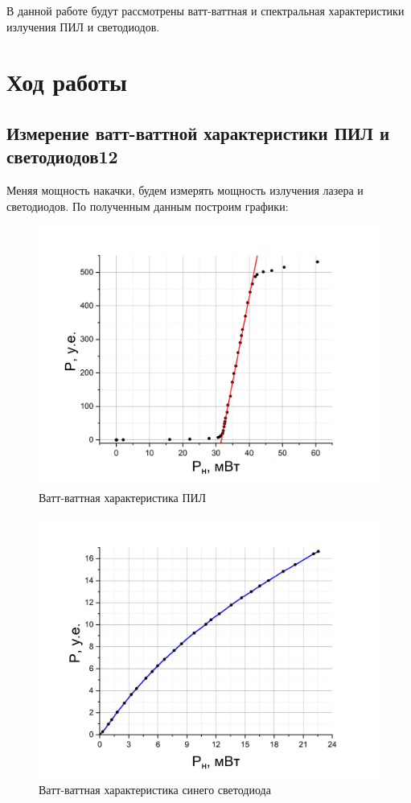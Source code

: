 \documentclass[a4paper,12pt]{article}
\begin{document}
В данной работе будут рассмотрены ватт-ваттная и спектральная характеристики излучения ПИЛ и светодиодов.
 
\section{Ход работы}

\subsection{Измерение ватт-ваттной характеристики ПИЛ и светодиодов12}

Меняя мощность накачки, будем измерять мощность излучения лазера и светодиодов. По полученным данным построим графики:

\begin{figure}[h!]
	\centering
	\includegraphics[width = 0.8\linewidth]{laser_vatt}
	\caption{Ватт-ваттная характеристика ПИЛ}
\end{figure}

\newpage

\begin{figure}[h!]
	\centering
	\includegraphics[width = 0.8\linewidth]{blue_vatt}
	\caption{Ватт-ваттная характеристика синего светодиода}
\end{figure}
\end{document}
